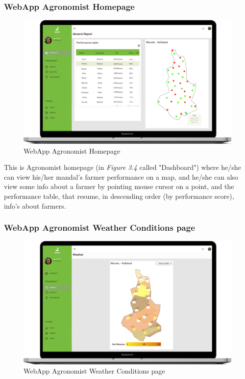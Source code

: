 \subsubsection{WebApp Agronomist Homepage}

\begin{figure}[H]
  \centering
  \includegraphics[width=140mm,scale=0.9]{./Images//Mocks/WebApp/Agronomist_Home.png}
  \caption{WebApp Agronomist Homepage}
\end{figure}

This is Agronomist homepage (in \textit{Figure 3.4} called "Dashboard") where he/she can view his/her mandal's farmer performance on a map, and he/she can also view some info about a farmer by pointing mouse cursor on a point, and the performance table, that resume, in descending order (by performance score), info's about farmers.

\subsubsection{WebApp Agronomist Weather Conditions page}

\begin{figure}[H]
  \centering
  \includegraphics[width=140mm,scale=0.9]{./Images//Mocks/WebApp/Agronomist_Weather.png}
  \caption{WebApp Agronomist Weather Conditions page}
\end{figure}

